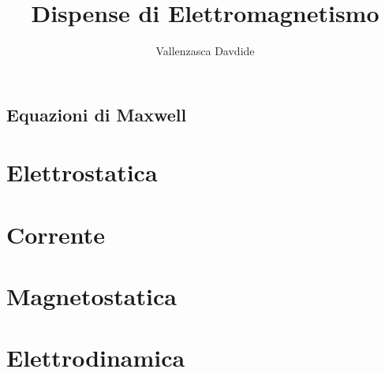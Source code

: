 \documentclass[a4paper]{book}
\theoremstyle{plain}
\theoremstyle{definition}
\begin{document}
\author{Vallenzasca Davdide}
\title{Dispense di Elettromagnetismo}
\maketitle

\newpage

\tableofcontents

\newpage

\chapter* {Equazioni di Maxwell}


\newpage
\part{Elettrostatica}


\part{Corrente}


\part{Magnetostatica}


\part{Elettrodinamica}



\appendix

\end{document}
